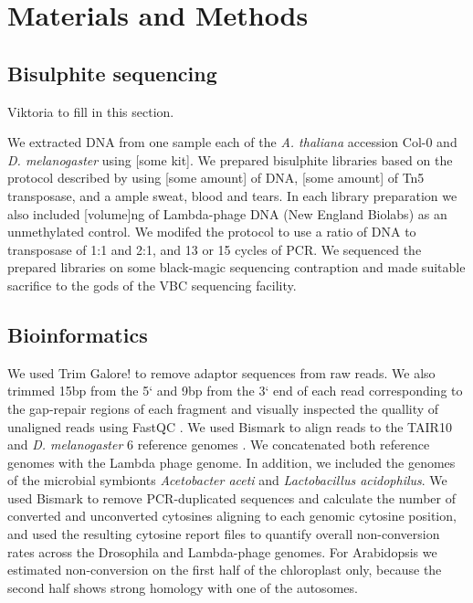 \documentclass[12pt,longbibliography]{article}
\begin{document}
\section{Materials and Methods}

\subsection{Bisulphite sequencing}

Viktoria to fill in this section.

We extracted DNA from one sample each of the \textit{A. thaliana} accession Col-0 and \textit{D. melanogaster} using [some kit].
We prepared bisulphite libraries based on the protocol described by \textcite{weichenhan2018tagmentation} using [some amount] of DNA, [some amount] of Tn5 transposase, and a ample sweat, blood and tears.
In each library preparation we also included [volume]ng of Lambda-phage DNA (New England Biolabs) as an unmethylated control.
We modifed the protocol to use a ratio of DNA to transposase of 1:1 and 2:1, and 13 or 15 cycles of PCR.
We sequenced the prepared libraries on some black-magic sequencing contraption and made suitable sacrifice to the gods of the VBC sequencing facility.

\subsection{Bioinformatics}

We used Trim Galore! to remove adaptor sequences from raw reads. We also trimmed 15bp from the 5` and 9bp from the 3` end of each read corresponding to the gap-repair regions of each fragment \parencite{krueger2015trim} and visually inspected the quallity of unaligned reads using FastQC \parencite{andrews2020fastqc}.
We used Bismark to align reads to the TAIR10 and \textit{D. melanogaster} 6 reference genomes \parencite{krueger2011bismark}.
We concatenated both reference genomes with the Lambda phage genome.
In addition, we included the genomes of the microbial symbionts \textit{Acetobacter aceti} and \textit{Lactobacillus acidophilus}.
We used Bismark to remove PCR-duplicated sequences and calculate the number of converted and unconverted cytosines aligning to each genomic cytosine position, and used the resulting cytosine report files to quantify overall non-conversion rates across the Drosophila and Lambda-phage genomes.
For Arabidopsis we estimated non-conversion on the first half of the chloroplast only, because the second half shows strong homology with one of the autosomes.
\end{document}
